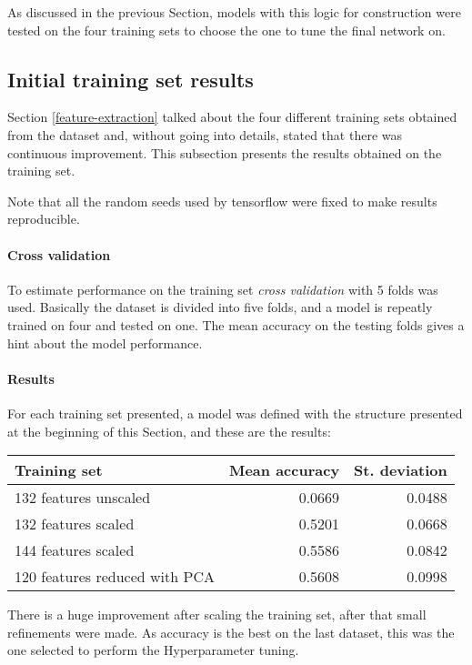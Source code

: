 As discussed in the previous Section, models with this logic for 
construction were tested on the four training sets to choose the one to tune 
the final network on.

\subsection{Initial training set results}

Section \vref{feature-extraction} talked about the four different 
training sets obtained from the dataset and, without going into details, 
stated that there was continuous improvement. This subsection presents
the results obtained on the training set. 

Note that all the random seeds used by tensorflow were fixed 
to make results reproducible.

\paragraph{Cross validation}
To estimate performance on the training set \emph{cross validation} with 
5 folds was used. Basically the dataset is divided into five folds, 
and a model is repeatly trained on four and tested on one. 
The mean accuracy on the testing folds gives a hint about the model performance.

\paragraph{Results}
For each training set presented, a model was defined 
with the structure presented at the beginning of this Section, 
and these are the results:

\begin{center}
    \begin{tabular}{ |l|r|r| } 
        \hline
        Training set & Mean accuracy & St. deviation \\
        \hline
        132 features unscaled &  0.0669 & 0.0488 \\
        132 features scaled &  0.5201 & 0.0668 \\
        144 features scaled &  0.5586 & 0.0842 \\
        120 features reduced with PCA &  0.5608 & 0.0998 \\
        \hline
    \end{tabular}
\end{center}

There is a huge improvement after scaling the training set, after 
that small refinements were made.
As accuracy is the best on the last dataset, this was the one selected to 
perform the Hyperparameter tuning.

